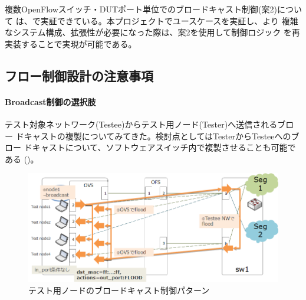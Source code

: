 複数OpenFlowスイッチ・DUTポート単位でのブロードキャスト制御(案2)について
は、\lopjc で実証できている。本プロジェクトでユースケースを実証し、より
複雑なシステム構成、拡張性が必要になった際は、案2を使用して制御ロジック
を再実装することで実現が可能である。

  \subsection{フロー制御設計の注意事項}

  \paragraph{Broadcast制御の選択肢}

テスト対象ネットワーク(Testee)からテスト用ノード(Tester)へ送信されるブロー
ドキャストの複製についてみてきた。検討点としてはTesterからTesteeへのブロー
ドキャストについて、ソフトウェアスイッチ内で複製させることも可能である
()。

\begin{figure}[h]
 \centering
 \includegraphics[scale=0.6]{img/l2bcctrl_another_pattern.png}
 \caption{テスト用ノードのブロードキャスト制御パターン}
 \label{fig:bcctrl_another_pattern}
\end{figure}

